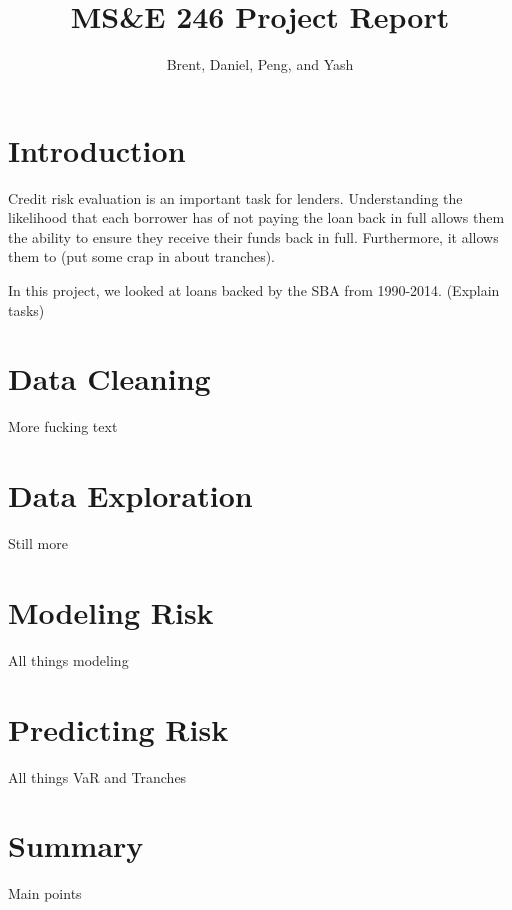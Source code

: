 \documentclass[]{report}
\title{MS\&E 246 Project Report}
\author{Brent, Daniel, Peng, and Yash}
\begin{document}
\maketitle

\section*{Introduction}
	Credit risk evaluation is an important task for lenders. Understanding the likelihood that each borrower has of not paying the loan back in full allows them the ability to ensure they receive their funds back in full. Furthermore, it allows them to (put some crap in about tranches).
	
	In this project, we looked at loans backed by the SBA from 1990-2014. (Explain tasks)
	
\section*{Data Cleaning}
	More fucking text
	
\section*{Data Exploration}
	Still more
	
\section*{Modeling Risk}
	All things modeling

\section*{Predicting Risk}
	All things VaR and Tranches
	
\section*{Summary}
	Main points
	
\end{document}
